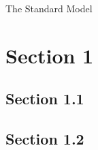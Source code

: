 \documentclass[a4paper]{article}
\begin{document}
  
 
\maketitle

{\small      
\setlength{\parindent}{0em}
\setlength{\parskip}{1em}
    The Standard Model
}

\tableofcontents
\newpage

\section{Section 1}
\lipsum
\subsection{Section 1.1}
\lipsum 
\lipsum
\subsection{Section 1.2}
\lipsum 
\lipsum

\nocite{tsmlecture} 
\printbibliography

\immediate{}
\end{document}
